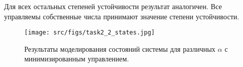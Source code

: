Для всех остальных степеней устойчивости результат аналогичен. Все управляемы собственные числа принимают значение степени устойчивости.
\begin{figure}[ht!]
    \centering
    \texttt{[image: src/figs/task2\_2\_states.jpg]}
    \caption{Результаты моделирования состояний системы для различных \(\alpha\) с минимизированным управлением.}
    \label{fig:task2_2_states}
\end{figure}

\FloatBarrier